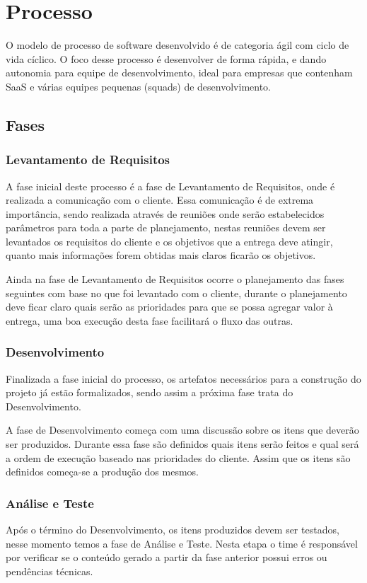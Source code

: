 \documentclass[	DIV=calc,%
							paper=a4,%
							fontsize=12pt,%
							onecolumn]{scrartcl}	 					%
\begin{document}
\section{Processo}
O modelo de processo de software desenvolvido é de categoria ágil com ciclo de vida cíclico. O foco desse processo é desenvolver de forma rápida, e dando autonomia para equipe de desenvolvimento, ideal para empresas que contenham SaaS e várias equipes pequenas (squads) \cite{spotify}  de desenvolvimento.

\subsection{Fases}
	\subsubsection{Levantamento de Requisitos}
	A fase inicial deste processo é a fase de Levantamento de Requisitos, onde é realizada a comunicação com o cliente. Essa comunicação é de extrema importância, sendo realizada através de reuniões onde serão estabelecidos parâmetros para toda a parte de planejamento, nestas reuniões devem ser levantados os requisitos do cliente e os objetivos que a entrega deve atingir, quanto mais informações forem obtidas mais claros ficarão os objetivos. 
	
	Ainda na fase de Levantamento de Requisitos ocorre o planejamento das fases seguintes com base no que foi levantado com o cliente, durante o planejamento deve ficar claro quais serão as prioridades para que se possa agregar valor à entrega, uma boa execução desta fase facilitará o fluxo das outras. 
	
	\subsubsection{Desenvolvimento}
	Finalizada a fase inicial do processo, os artefatos necessários para a construção do projeto já estão formalizados, sendo assim a próxima fase trata do Desenvolvimento. 
	
	A fase de Desenvolvimento começa com uma discussão sobre os itens que deverão ser produzidos. Durante essa fase são definidos quais itens serão feitos e qual será a ordem de execução baseado nas prioridades do cliente. Assim que os itens são definidos começa-se a produção dos mesmos. 
	
	\subsubsection{Análise e Teste}
	 Após o término do Desenvolvimento, os itens produzidos devem ser testados, nesse momento temos a fase de Análise e Teste. Nesta etapa o time é responsável por verificar se o conteúdo gerado a partir da fase anterior possui erros ou pendências técnicas. 
	
\end{document}
